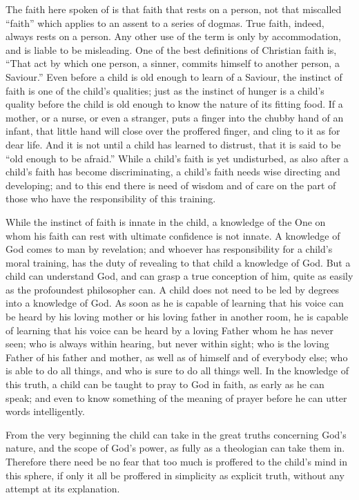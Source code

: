 \documentclass[
]{book}
\begin{document}
The faith here spoken of is that faith that rests on a person, not that miscalled ``faith'' which applies to an assent to a series of dogmas. True faith, indeed, always rests on a person. Any other use of the term is only by accommodation, and is liable to be misleading. One of the best definitions of Christian faith is, ``That act by which one person, a sinner, commits himself to another person, a Saviour.'' Even before a child is old enough to learn of a Saviour, the instinct of faith is one of the child's qualities; just as the instinct of hunger is a child's quality before the child is old enough to know the nature of its fitting food. If a mother, or a nurse, or even a stranger, puts a finger into the chubby hand of an infant, that little hand will close over the proffered finger, and cling to it as for dear life. And it is not until a child has learned to distrust, that it is said to be ``old enough to be afraid.'' While a child's faith is yet undisturbed, as also after a child's faith has become discriminating, a child's faith needs wise directing and developing; and to this end there is need of wisdom and of care on the part of those who have the responsibility of this training.

While the instinct of faith is innate in the child, a knowledge of the One on whom his faith can rest with ultimate confidence is not innate. A knowledge of God comes to man by revelation; and whoever has responsibility for a child's moral training, has the duty of revealing to that child a knowledge of God. But a child can understand God, and can grasp a true conception of him, quite as easily as the profoundest philosopher can. A child does not need to be led by degrees into a knowledge of God. As soon as he is capable of learning that his voice can be heard by his loving mother or his loving father in another room, he is capable of learning that his voice can be heard by a loving Father whom he has never seen; who is always within hearing, but never within sight; who is the loving Father of his father and mother, as well as of himself and of everybody else; who is able to do all things, and who is sure to do all things well. In the knowledge of this truth, a child can be taught to pray to God in faith, as early as he can speak; and even to know something of the meaning of prayer before he can utter words intelligently.

From the very beginning the child can take in the great truths concerning God's nature, and the scope of God's power, as fully as a theologian can take them in. Therefore there need be no fear that too much is proffered to the child's mind in this sphere, if only it all be proffered in simplicity as explicit truth, without any attempt at its explanation.
\end{document}

